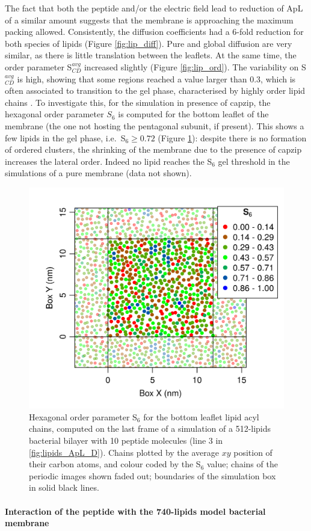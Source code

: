 The fact that both the peptide and/or the electric field lead to reduction of ApL of a similar amount suggests that the membrane is approaching the maximum packing allowed.
%
Consistently, the diffusion coefficients had a 6-fold reduction for both species of lipids (Figure \ref{fig:lip_diff}). Pure and global diffusion are very similar, as there is little translation between the leaflets.
%
At the same time, the order parameter S$^{avg}_{CD}$ increased slightly (Figure \ref{fig:lip_ord}). The variability on S$^{avg}_{CD}$ is high, showing that some regions reached a value larger than 0.3, which is often associated to transition to the gel phase, characterised by highly order lipid chains \citep{Pluhackova2016}.
%
To investigate this, for the simulation in presence of capzip, the hexagonal order parameter $S_6$ is computed for the bottom leaflet of the membrane (the one not hosting the pentagonal subunit, if present). This shows a few lipids in the gel phase, i.e.\ S$_6 \ge 0.72$ (Figure \ref{fig:S6_pb4}): despite there is no formation of ordered clusters, the shrinking of the membrane due to the presence of capzip increases the lateral order. Indeed no lipid reaches the S$_6$ gel threshold in the simulations of a pure membrane (data not shown).
%
\begin{figure}
\centering
\includegraphics[width=0.5\linewidth]{3results_capsule/pics/pb4_S6.png} 
\caption[Lipid hexagonal order parameter in an atomistic protein-lipid simulation]{Hexagonal order parameter S$_6$ for the bottom leaflet lipid acyl chains, computed on the last frame of a simulation of a 512-lipids bacterial bilayer with 10 peptide molecules (line 3 in \ref{fig:lipids_ApL_D}). Chains plotted by the average $xy$ position of their carbon atoms, and colour coded by the S$_6$ value; chains of the periodic images shown faded out; boundaries of the simulation box in solid black lines.}
\label{fig:S6_pb4}
\end{figure}

\paragraph{Interaction of the peptide with the 740-lipids model bacterial membrane}

